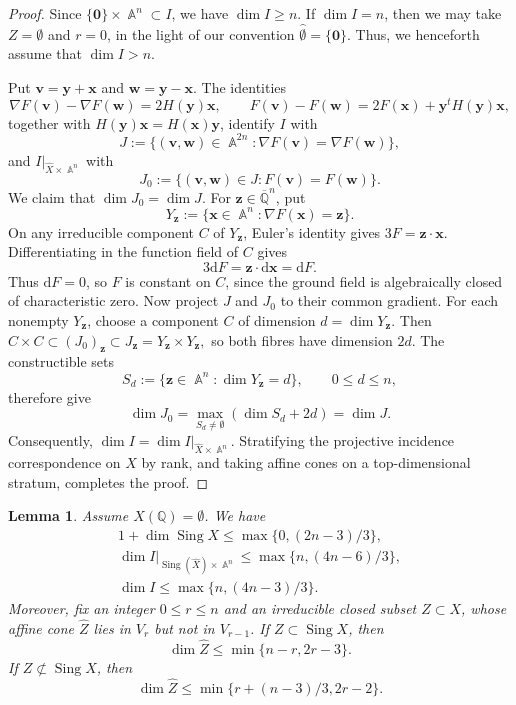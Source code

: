 \documentclass[a4paper,11pt, twoside,reqno]{amsart}
\theoremstyle{plain}
\newtheorem{lemma}[thm]{Lemma}
\theoremstyle{definition}
\theoremstyle{remark}
\newcommand{\bfv}{\bm{v}}
\newcommand{\bfx}{\bm{x}}
\newcommand{\bfy}{\bm{y}}
\newcommand{\bfz}{\bm{z}}
\newcommand{\QQ}{\mathbb{Q}}
\DeclareMathOperator{\sing}{Sing}
\DeclareMathOperator{\A}{\mathbb{A}}
\newcommand{\dd}{\mathrm{d}}
\renewcommand{\le}{\leqslant}
\renewcommand{\ge}{\geqslant}
\newcommand{\bfw}{\bm{w}}
\newcommand{\Qbar}{\overline{\mathbb{Q}}}
\newcommand{\cone}{\widehat}
\numberwithin{equation}{section}
\begin{document}
\begin{proof}
Since $\{\bm0\}\times\A^n\subset I$, we have $\dim I\ge n$.
If $\dim I=n$, then we may take $Z=\emptyset$ and $r=0$,
in the light of our convention $\cone \emptyset=\{\bm0\}$.
Thus, we henceforth assume that $\dim I>n$.

Put $\bfv=\bfy+\bfx$ and $\bfw=\bfy-\bfx$.
The identities
$$
\nabla F(\bfv)-\nabla F(\bfw)=2H(\bfy)\bfx,
\qquad
F(\bfv)-F(\bfw)=2F(\bfx)+\bfy^tH(\bfy)\bfx,
$$
together with $H(\bfy)\bfx=H(\bfx)\bfy$, identify $I$ with
$$
J:=\{(\bfv,\bfw)\in\A^{2n}:
\nabla F(\bfv)=\nabla F(\bfw)\},
$$
and $I\vert_{\cone X\times\A^n}$ with
$$
J_0:=\{(\bfv,\bfw)\in J:F(\bfv)=F(\bfw)\}.
$$
We claim that $\dim J_0=\dim J$.
For $\bfz\in\Qbar^n$, put
$$
Y_{\bfz}:=\{\bfx\in\A^n:\nabla F(\bfx)=\bfz\}.
$$
On any irreducible component $C$ of $Y_{\bfz}$,
Euler's identity gives $3F=\bfz\cdot\bfx$.
Differentiating in the function field of $C$ gives
$$
3\dd F=\bfz\cdot\dd\bfx=\dd F.
$$
Thus $\dd F=0$, so $F$ is constant on $C$, since the ground
field is algebraically closed of characteristic zero.
Now project $J$ and $J_0$ to their common gradient.
For each nonempty $Y_{\bfz}$, choose a component $C$ of
dimension $d=\dim Y_{\bfz}$.
Then
$
C\times C\subset (J_0)_{\bfz}
\subset J_{\bfz}=Y_{\bfz}\times Y_{\bfz},
$
so both fibres have dimension $2d$.
The constructible sets
$$
S_d:=\{\bfz\in\A^n:\dim Y_{\bfz}=d\},
\qquad 0\le d\le n,
$$
therefore give
$$
\dim J_0
=\max_{S_d\ne\emptyset}(\dim S_d+2d)
=\dim J.
$$
Consequently, $\dim I=\dim I\vert_{\cone X\times\A^n}$.
Stratifying the projective incidence correspondence on $X$ by rank,
and taking affine cones on a top-dimensional stratum,
completes the proof.
\end{proof}



\begin{lemma}
\label{LEM:433-incidence-bound}
Assume $X(\QQ)=\emptyset$.
We have
\begin{align}
1 + \dim \sing X \le \max\{0, (2n-3)/3\},
\label{EQ:clean-slop-sing-bound} \\
\dim I\vert_{\sing(\cone X) \times \A^n} \le \max\{n, (4n-6)/3\},
\label{EQ:clean-slop-sing-incidence-bound} \\
\dim I \le \max\{n, (4n-3)/3\}.
\label{EQ:clean-slop-incidence-bound}
\end{align}
Moreover, fix an integer $0\le r\le n$
and an irreducible closed subset $Z \subset X$,
whose affine cone $\cone Z$ lies in $V_r$ but not in $V_{r-1}$.
If $Z \subset \sing X$, then
\begin{equation}
\label{EQ:slop-sing-bound}
\dim \cone Z \le \min\{n-r,2r-3\}.
\end{equation}
If $Z \not\subset \sing X$, then
\begin{equation}
\label{EQ:slop-smooth-bound}
\dim \cone Z \le \min\{r+(n-3)/3,2r-2\}.
\end{equation}
\end{lemma}
\end{document}
